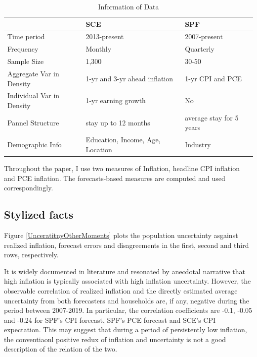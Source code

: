 \documentclass[]{article}
\begin{document}
\begin{table}[ht]
			\caption{Information of Data}
			\label{DataInfo}
	\begin{tabular}{lll} 

		\hline 
		& SCE & SPF        \\
		\hline 
		Time period                                    & 2013-present                            & 2007-present             \\
		Frequency                                      & Monthly                                 & Quarterly                \\
		Sample Size                                    & 1,300                                   & 30-50                    \\
		Aggregate Var in Density                       & 1-yr  and 3-yr ahead inflation          & 1-yr CPI and PCE         \\
		Individual Var in Density                      & 1-yr earning growth                     & No                       \\
		Pannel Structure                               & stay up to 12 months                    & average stay for 5 years \\
		Demographic Info                        & Education, Income, Age, Location        & Industry    \\
		\hline 
	\end{tabular}
\end{table}

Throughout the paper, I use two measures of Inflation, headline CPI inflation and PCE inflation. The forecasts-based measures are computed and used correspondingly.  

\subsection{Stylized facts}

Figure \ref{UnceratitnyOtherMoments} plots the population uncertainty asgainst realized inflation,  forecast errors and disagreements in the first, second and third rows, respectively. 

It is widely documented in literature \cite{xxx, xxx} and resonated by anecdotal narrative that high inflation is typically associated with high inflation uncertainty. However, the observable correlation of realized inflation and the directly estimated average uncertainty from both  forecasters and households are, if any, negative during the period between 2007-2019. In particular, the correlation coefficients are -0.1, -0.05 and -0.24 for SPF's  CPI forecast, SPF's PCE forecast and SCE's CPI expectation. This may suggest that during a period of persistently low inflation, the conventiaonl positive redux of inflation and uncertainty is not a good description of the relation of the two. 
\end{document}

